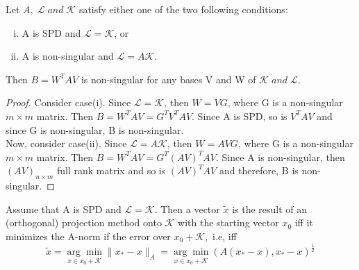 \documentclass[10pt,a4paper]{article}
\begin{document}
\begin{prop}
Let $A,\;\mathcal{L}\;and\;\mathcal{K}$ satisfy either one of the two following conditions:
\begin{enumerate}[i.]
\item A is SPD and $\mathcal{L}=\mathcal{K}$, or
\item A is non-singular and $\mathcal{L}=A\mathcal{K}$.
\end{enumerate}
Then $B=W^TAV$ is non-singular for any bases V and W of $\mathcal{K}\;and\;\mathcal{L}$.
\end{prop}

\begin{proof}
Consider case(i). Since $\mathcal{L}=\mathcal{K}$, then $W=VG$, where G is a non-singular $m\times m$ matrix. Then $B=W^TAV={G^T}V^TAV$. Since A is SPD, so is $V^TAV$ and since G is non-singular, B is non-singular. \\
Now, consider case(ii). Since $\mathcal{L}=A\mathcal{K}$, then $W=AVG$, where G is a non-singular $m\times m$ matrix. Then $B=W^TAV={G^T}(AV)^TAV$. Since A is non-singular, then $(AV)_{n\times m }$ full rank matrix and so is $(AV)^TAV$ and therefore, B is non-singular.
\end{proof}

\begin{theorem}
Assume that A is SPD and $\mathcal{L}=\mathcal{K}.$ Then a vector $\tilde{x}$ is the result of an (orthogonal) projection method onto $\mathcal{K}$ with the  starting vector $x_0$ iff it minimizes the A-norm if the error over $x_0+\mathcal{K},$ i.e, iff
$$\tilde{x} = \underset{x\in x_0+\mathcal{K}}{\arg\min}\|x_*-x\|_A=\underset{x\in x_0+\mathcal{K}}{\arg\min}(A(x_*-x),x_*-x)^{\frac{1}{2}}$$
\end{theorem}
\end{document}
